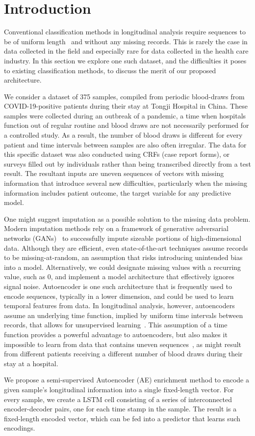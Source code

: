 \section{Introduction}
Conventional classification methods in longitudinal analysis require sequences
to be of uniform length~\cite{lu2018predicting} and without any missing
records. This is rarely the case in data collected in the field and especially
rare for data collected in the health care industry. In this section we explore
one such dataset, and the difficulties it poses to existing classification
methods, to discuss the merit of our proposed architecture.

We consider a dataset of 375 samples, compiled from periodic blood-draws from
COVID-19-positive patients during their stay at Tongji Hospital in China.
These samples were collected during an outbreak of a pandemic, a time when
hospitals function out of regular routine and blood draws are not necessarily
performed for a controlled study. As a result, the number of blood draws is
different for every patient and time intervals between samples are also often
irregular. The data for this specific dataset was also conducted using CRFs
(case report forms), or surveys filled out by individuals rather than being
transcribed directly from a test result. The resultant inputs are uneven
sequences of vectors with missing information that introduce several new
difficulties, particularly when the missing information includes patient
outcome, the target variable for any predictive model. 

One might suggest imputation as a possible solution to the missing data
problem. Modern imputation methods rely on a framework of generative
adversarial networks (GANs)~\cite{yoon2018gain} to successfully impute sizeable
portions of high-dimensional data. Although they are efficient, even
state-of-the-art techniques assume records to be missing-at-random, an
assumption that risks introducing unintended bias into a model. Alternatively,
we could designate missing values with a recurring value, such as 0, and
implement a model architecture that effectively ignores signal noise.
Autoencoder is one such architecture that is frequently used to encode
sequences, typically in a lower dimension, and could be used to learn temporal
features from data. In longitudinal analysis, however, autoencoders assume an
underlying time function, implied by uniform time intervals between records,
that allows for unsupervised
learning~\cite{langkvist2014review,srivastava2015unsupervised}. This assumption
of a time function provides a powerful advantage to autoencoders, but also
makes it impossible to learn from data that contains uneven
sequences~\cite{yu2013embedding}, as might result from different patients
receiving a different number of blood draws during their stay at a hospital. 

We propose a semi-supervised Autoencoder (AE) enrichment method to encode a
given sample's longitudinal information into a single fixed-length vector. For
every sample, we create a LSTM cell consisting of a series of interconnected
encoder-decoder pairs, one for each time stamp in the sample. The result is a
fixed-length encoded vector, which can be fed into a predictor that learns such
encodings. 
